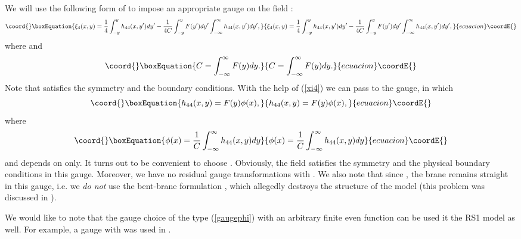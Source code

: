 \documentclass[a4paper,12pt]{article}
\begin{document}
We will use the following form of \coordHE{} to impose an appropriate gauge on the
field \coordHE{}:
\begin{equation}\coord{}\boxEquation{\label{xi4}
\xi_4(x,y)=\frac{1}{4}\int_{-y}^y h_{44} (x,y') dy' -\frac{1}{4C}
\int_{-y}^y F(y') dy' \int_{-\infty}^{\infty} h_{44} (x,y') dy',
}{\xi_4(x,y)=\frac{1}{4}\int_{-y}^y h_{44} (x,y') dy' -\frac{1}{4C}
\int_{-y}^y F(y') dy' \int_{-\infty}^{\infty} h_{44} (x,y') dy',
}{ecuacion}\coordE{}\end{equation}
where \coordHE{} and
\begin{equation}\coord{}\boxEquation{
C=\int_{-\infty}^{\infty} F(y) dy.
}{
C=\int_{-\infty}^{\infty} F(y) dy.
}{ecuacion}\coordE{}\end{equation}
Note that \coordHE{} satisfies the symmetry and the boundary conditions.
With the help of (\ref{xi4}) we can pass to the gauge, in which
\begin{equation}\coord{}\boxEquation{\label{gaugephi}
h_{44}(x,y)=F(y)\phi(x),
}{h_{44}(x,y)=F(y)\phi(x),
}{ecuacion}\coordE{}\end{equation}
where
\begin{equation}\coord{}\boxEquation{
\phi(x)=\frac{1}{C}\int_{-\infty}^{\infty} h_{44} (x,y) dy
}{
\phi(x)=\frac{1}{C}\int_{-\infty}^{\infty} h_{44} (x,y) dy
}{ecuacion}\coordE{}\end{equation}
and depends on \coordHE{} only. It turns out to be convenient to choose
\coordHE{}. Obviously, the field \coordHE{} satisfies the
symmetry and the physical boundary conditions in this gauge. Moreover, we
have no residual gauge transformations with \coordHE{}. We also note that
since \coordHE{}, the brane remains straight in this gauge, i.e. we
{\it do not} use the bent-brane formulation \cite{GarTan,RKatz}, which
allegedly destroys the structure of the model (this problem was discussed
in \cite{AIMVV}).

We would like to note that the gauge choice of the type (\ref{gaugephi})
with an arbitrary finite even function \coordHE{} can be used it the RS1 model
as well. For example, a gauge with \coordHE{} was
used in \cite{Toharia}.
\end{document}
